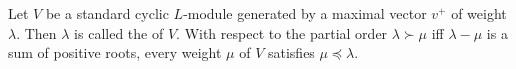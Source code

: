 Let $V$ be a standard cyclic $L$-module generated by a maximal vector $v^+$ of weight $\lambda$. Then $\lambda$ is called the  of $V$. With respect to the partial order $\lambda \succ \mu$ iff $\lambda - \mu$ is a sum of positive roots, every weight $\mu$ of $V$ satisfies $\mu \preceq \lambda$.
